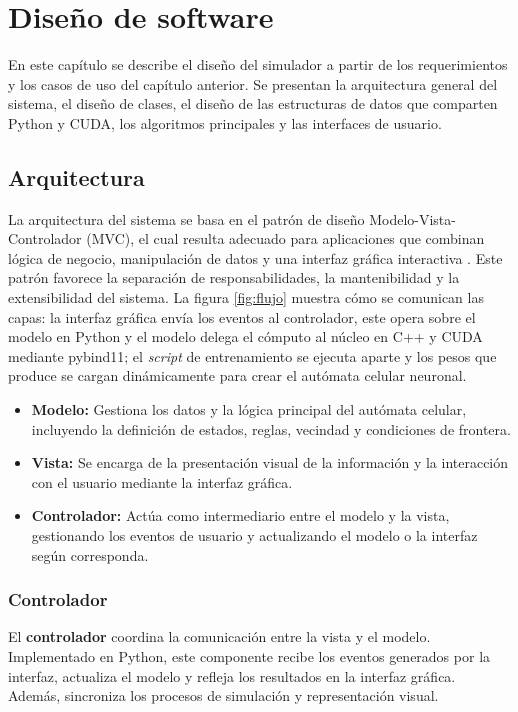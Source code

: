 \chapter{Diseño de software}

En este capítulo se describe el diseño del simulador a partir de los requerimientos y los casos de uso del capítulo anterior. Se presentan la arquitectura general del sistema, el diseño de clases, el diseño de las estructuras de datos que comparten Python y CUDA, los algoritmos principales y las interfaces de usuario.

\section{Arquitectura}
\label{sec:arquitectura}

La arquitectura del sistema se basa en el patrón de diseño Modelo-Vista-Controlador (MVC), el cual resulta adecuado para aplicaciones que combinan lógica de negocio, manipulación de datos y una interfaz gráfica interactiva \cite{mvc}. Este patrón favorece la separación de responsabilidades, la mantenibilidad y la extensibilidad del sistema. La figura \ref{fig:flujo} muestra cómo se comunican las capas: la interfaz gráfica envía los eventos al controlador, este opera sobre el modelo en Python y el modelo delega el cómputo al núcleo en C++ y CUDA mediante pybind11; el \textit{script} de entrenamiento se ejecuta aparte y los pesos que produce se cargan dinámicamente para crear el autómata celular neuronal.

\begin{itemize}
	\item \textbf{Modelo:} Gestiona los datos y la lógica principal del autómata celular, incluyendo la definición de estados, reglas, vecindad y condiciones de frontera.
	\item \textbf{Vista:} Se encarga de la presentación visual de la información y la interacción con el usuario mediante la interfaz gráfica.
	\item \textbf{Controlador:} Actúa como intermediario entre el modelo y la vista, gestionando los eventos de usuario y actualizando el modelo o la interfaz según corresponda.
\end{itemize}

\subsection{Controlador}

El \textbf{controlador} coordina la comunicación entre la vista y el modelo. Implementado en Python, este componente recibe los eventos generados por la interfaz, actualiza el modelo y refleja los resultados en la interfaz gráfica. Además, sincroniza los procesos de simulación y representación visual.

